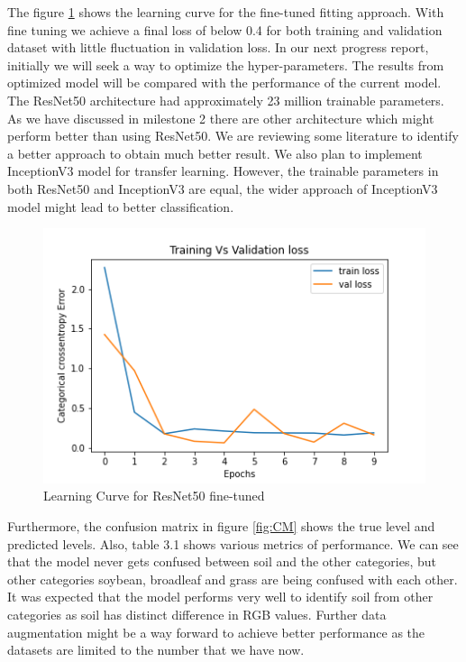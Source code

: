 \documentclass{report}
\begin{document}
The figure \ref{fig:Fine-Tuned} shows the learning curve for the fine-tuned fitting approach. With fine tuning we achieve a final loss of below 0.4 for both training and validation dataset with little fluctuation in validation loss.  In our next progress report, initially we will seek a way to optimize the hyper-parameters. The results from optimized model will be compared with the performance of the current model. The ResNet50 architecture had approximately 23 million trainable parameters. As we have discussed in milestone 2 there are other architecture which might perform better than using ResNet50. We are reviewing some literature to identify a better approach to obtain much better result. We also plan to implement InceptionV3 model for transfer learning. However, the trainable parameters in both ResNet50 and InceptionV3 are equal, the wider approach of InceptionV3 model might lead to better classification.
\begin{figure}[H]
    \centering
    \includegraphics[width=\textwidth]{LossVal_lossR50FineTune.png}
    \caption{Learning Curve for ResNet50 fine-tuned}
    \label{fig:Fine-Tuned}
\end{figure}


Furthermore, the confusion matrix in figure \ref{fig:CM} shows the true level and predicted levels. Also, table 3.1 shows various metrics of performance.  We can see that the model never gets confused between soil and the other categories, but other categories soybean, broadleaf and grass are being confused with each other. It was expected that the model performs very well to identify soil from other categories as soil has distinct difference in RGB values. Further data augmentation might be a way forward to achieve better performance as the datasets are limited to the number that we have now.
\end{document}
